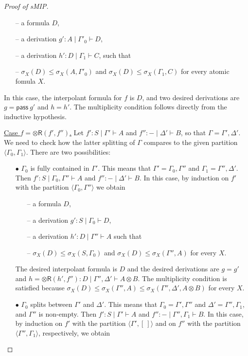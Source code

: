 \documentclass[sn-mathphys-num]{sn-jnl}%
\newcommand{\GG}{\Gamma}
\newcommand{\vd}{\vdash}
\newcommand{\tr}{\otimes\mathsf{R}}
\newcommand{\pass}{\mathsf{pass}}
\newcommand{\ot}{\otimes}
\newcommand{\gs}[1]{\sigma_{X} (#1)}
\newcommand{\sMIP}{\textsf{sMIP}}
\theoremstyle{thmstyleone}%
\theoremstyle{thmstyletwo}%
\theoremstyle{thmstylethree}%
\begin{document}
\begin{proof}[Proof of \sMIP]
\begin{itemize}
\begin{itemize}
\item[--] a formula $D$,
\item[--] a derivation $g' : A \mid \GG'_0 \vd D$,
\item[--] a derivation $h' : D \mid \GG_1 \vd C$, such that
\item[--] $\gs{D} \leq \gs{A, \GG'_0} $ and $ \gs{D} \leq \gs{\GG_1, C}$ for every atomic fomula $X$.
\end{itemize}
In this case, the interpolant formula for $f$ is $D$, and two desired derivations are $g = \pass \ g'$ and $h = h'$.
The multiplicity condition follows directly from the inductive hypothesis.
\end{itemize} 
\underline{Case $f = \tr (f',f'')$.} Let $f' : S \mid \Gamma' \vd A$ and $f'' : {-} \mid \Delta' \vd B$, so that $\GG = \GG' ,\Delta'$. We need to check how the latter splitting of $\GG$ compares to the given partition $\langle \GG_0,\GG_1 \rangle$. 
There are two possibilities:
\begin{itemize}
\item[$\bullet$] $\GG_0$ is fully contained in $\Gamma'$. 
This means that $\GG' = \GG_0 , \GG''$ and $\GG_1 = \GG'',\Delta'$.
Then $f' : S \mid \GG_0 , \GG'' \vd A$ and $f'' : {-} \mid \Delta' \vd B$.
In this case, by induction on $f'$ with the partition $\langle \GG_0 , \GG'' \rangle$ we obtain
\begin{itemize}
\item[--] a formula $D$,
\item[--] a derivation $g' : S \mid \GG_0 \vd D$, 
\item[--] a derivation $h' : D \mid \GG'' \vd A$ such that 
\item[--] $\gs{D} \leq \gs{S, \GG_0} $ and $ \gs{D} \leq \gs{\GG'' , A}$ for every $X$.
\end{itemize}
The desired interpolant formula is $D$ and the desired derivations are $g = g'$ and $h = \tr (h' , f'') : D \mid \GG'' , \Delta' \vd A \ot B$.
The multiplicity condition is satisfied because $\gs{D} \leq \gs{\GG'' , A} \leq \gs{\GG'' , \Delta' , A \ot B}$ for every $X$.
\item[$\bullet$]  $\Gamma_0$ splits between $\Gamma'$ and $\Delta'$. 
This means that $\Gamma_0 = \Gamma',\GG''$ and $\Delta' = \GG'',\Gamma_1$, and $\GG''$ is non-empty.
Then $f' : S \mid \GG' \vd A$ and $f'': {-} \mid \GG'', \GG_1 \vd B$.
In this case, by induction on $f'$ with the partition $\langle \GG' , [\ ] \rangle $ and on $f''$ with the partition $\langle \GG'' , \GG_1 \rangle$, respectively, we obtain
\begin{itemize}

\end{itemize}
\end{itemize}
\end{proof}
\end{document}
